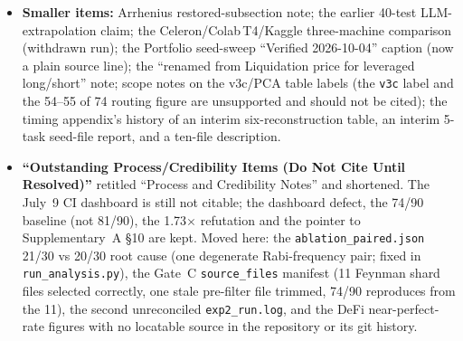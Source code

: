 \documentclass[11pt]{article}
\begin{document}
\begin{itemize}
Portfolio Expected Shortfall (correlated assets), Theta of option and Black--Scholes Call Price, including ``13 of 30 runs'' and
``zero successful runs in 28 attempts''. All depend on $K=30$ multi-run raw data that is not in the repository. If a multi-run rerun is done,
rebuild the section from its raw output, not from these figures.
\item \textbf{Smaller items:} Arrhenius restored-subsection note; the earlier 40-test LLM-extrapolation claim; the Celeron/Colab\,T4/Kaggle
three-machine comparison (withdrawn run); the Portfolio seed-sweep ``Verified 2026-10-04'' caption (now a plain source line);
the ``renamed from Liquidation price for leveraged long/short'' note; scope notes on the v3c/PCA table labels (the \texttt{v3c} label
and the 54--55 of 74 routing figure are unsupported and should not be cited); the timing appendix's history of an interim six-reconstruction table,
an interim 5-task seed-file report, and a ten-file description.
\item \textbf{``Outstanding Process/Credibility Items (Do Not Cite Until Resolved)''} retitled ``Process and Credibility Notes'' and
shortened. The July~9 CI dashboard is still not citable; the dashboard defect, the 74/90 baseline (not 81/90), the 1.73$\times$ refutation
and the pointer to Supplementary~A \S10 are kept. Moved here: the \texttt{ablation\_paired.json} 21/30 vs 20/30 root cause (one degenerate
Rabi-frequency pair; fixed in \texttt{run\_analysis.py}), the Gate~C \texttt{source\_files} manifest (11 Feynman shard files selected correctly,
one stale pre-filter file trimmed, 74/90 reproduces from the 11), the second unreconciled \texttt{exp2\_run.log}, and the DeFi near-perfect-rate
figures with no locatable source in the repository or its git history.
\end{itemize}
\end{document}

